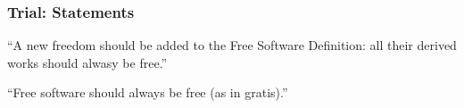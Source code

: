 \begin{frame}
\frametitle{Trial: Statements}

\begin{center}
\begin{LARGE}
``A new freedom should be added to the Free Software Definition:
all their derived works should alwasy be free.''
\end{LARGE}
\end{center}
\begin{center}
\begin{LARGE}
``Free software should always be free (as in gratis).''
\end{LARGE}
\end{center}

\end{frame}


